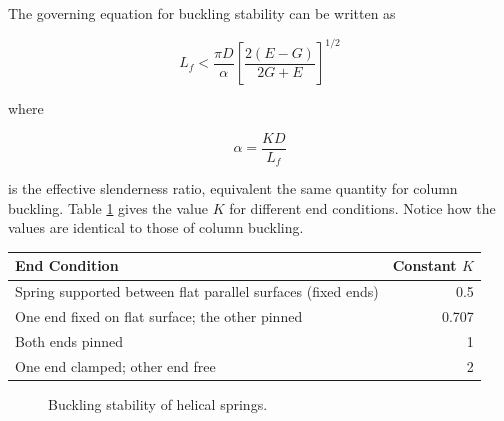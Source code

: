 \documentclass[a4paper,openany,12pt]{book}
\begin{document}
{{The governing equation for buckling stability can be written as

$$L_f < \frac{\pi D}{\alpha} \left[ \frac{2(E-G)}{2G+E} \right]^{1/2}$$

where

$$\alpha = \frac{KD}{L_f}$$

is the effective slenderness ratio, equivalent the same quantity for
column buckling. Table
\ref{table: spring buckling} gives the value
\(K\) for different end conditions. Notice how the values are identical to
those of column buckling.


\begin{table}[htbp]
\label{table: spring buckling}
\centering
\begin{tabular}{lr}
\toprule
End Condition & Constant \(K\)\\
\midrule
Spring supported between flat parallel surfaces (fixed ends) & 0.5\\
One end fixed on flat surface; the other pinned & 0.707\\
Both ends pinned & 1\\
One end clamped; other end free & 2\\
\bottomrule
\end{tabular}
\end{table}

\begin{figure}[h]
  \centering
  \caption{Buckling stability of helical springs.}
  \label{fig: spring buckling}
\end{figure}

}}
\end{document}
